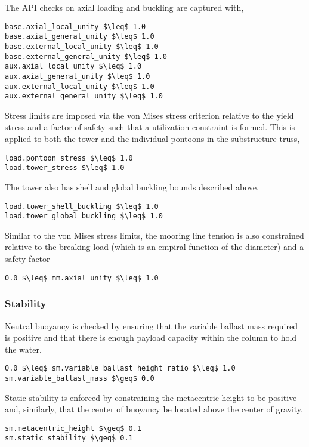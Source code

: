 The API checks on axial loading and buckling are captured with,
\begin{lstlisting}
base.axial_local_unity $\leq$ 1.0
base.axial_general_unity $\leq$ 1.0
base.external_local_unity $\leq$ 1.0
base.external_general_unity $\leq$ 1.0
aux.axial_local_unity $\leq$ 1.0
aux.axial_general_unity $\leq$ 1.0
aux.external_local_unity $\leq$ 1.0
aux.external_general_unity $\leq$ 1.0
\end{lstlisting}

Stress limits are imposed via the von Mises stress criterion relative to
the yield stress and a factor of safety such that a utilization
constraint is formed.  This is applied to both the tower and the
individual pontoons in the substructure truss,
\begin{lstlisting}
load.pontoon_stress $\leq$ 1.0
load.tower_stress $\leq$ 1.0
\end{lstlisting}

The tower also has shell and global buckling bounds described above,
\begin{lstlisting}
load.tower_shell_buckling $\leq$ 1.0
load.tower_global_buckling $\leq$ 1.0
\end{lstlisting}

Similar to the von Mises stress limits, the mooring line tension is also
constrained relative to the breaking load (which is an empiral function of
the diameter) and a safety factor
\begin{lstlisting}
0.0 $\leq$ mm.axial_unity $\leq$ 1.0
\end{lstlisting}
            
\subsubsection{Stability}
Neutral buoyancy is checked by ensuring that the variable ballast mass
required is positive and that there is enough payload capacity within
the column to hold the water,
\begin{lstlisting}
0.0 $\leq$ sm.variable_ballast_height_ratio $\leq$ 1.0
sm.variable_ballast_mass $\geq$ 0.0
\end{lstlisting}

Static stability is enforced by constraining the metacentric height to
be positive and, similarly, that the center of buoyancy be located above
the center of gravity,
\begin{lstlisting}
sm.metacentric_height $\geq$ 0.1
sm.static_stability $\geq$ 0.1
\end{lstlisting}

